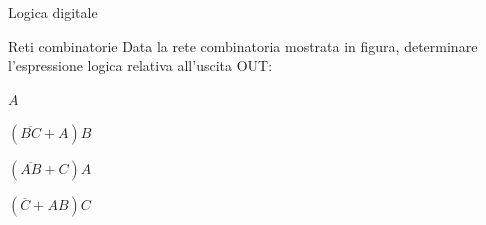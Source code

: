 \documentclass[11pt]{article}
\begin{document}
\begin{quiz}{Logica digitale}
\begin{multi}[points=1,shuffle=true]{Reti combinatorie}
    Data la rete combinatoria mostrata in figura, determinare l'espressione logica relativa all'uscita OUT:

    \item* $A$
    \item $(\overline{BC}+A)B$
    \item $(\overline{AB}+C)A$
    \item $(\overline{C}+AB)C$
\end{multi}

\end{quiz}
\end{document}
